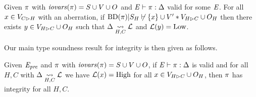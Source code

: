 \begin{lemma}
  Given $\pi$ with $\mathit{iovars}(\pi) = S \cup V \cup O$ and
  $\mathit{E} \vdash \pi : \Delta$ valid for some $\mathit{E}$.  For all $x \in
  V_{C \rhd H}$ with an aberration, if
  $\mathrm{BD}(\pi)|S_H \not\vdash \{ x \} \cup V' * V_{H \rhd C} \cup O_H$
  then there exists $y \in V_{H \rhd C} \cup O_H$ such that
  $\Delta \underset{H,C}{\leadsto} \mathcal{L}$ and $\mathcal{L}(y) = \mathrm{Low}$.
\end{lemma}


Our main type soundness result for integrity is then given as follows.
\begin{theorem}
  \label{theorem-ipj}
  Given  $\mathit{E}_{\mathit{pre}}$ and $\pi$ with
  $\mathit{iovars}(\pi) = S \cup V \cup O$, if
  $\mathit{E} \vdash \pi : \Delta$ is valid
  and for all $H,C$ with $\Delta \underset{H,C}{\leadsto} \mathcal{L}$ 
  we have $\mathcal{L}(x) = \mathrm{High}$ for all $x \in V_{H \rhd C} \cup O_H$, then $\pi$
  has integrity for all $H,C$.
\end{theorem}
